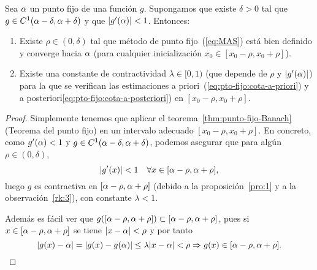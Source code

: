 \begin{theorem}
  \label{thm:punto-fijo-convergencia-local}
  Sea $\alpha$ un punto fijo de una función $g$. Supongamos que existe
  $\delta>0$ tal que $g\in C^1(\alpha-\delta,\alpha+\delta)$ y que
  $|g'(\alpha)|<1$. Entonces:
  \begin{enumerate}
  \item Existe $\rho\in (0,\delta)$ tal que método de punto
    fijo~(\ref{eq:MAS}) está bien definido y converge hacia $\alpha$
    (para cualquier inicialización $x_0 \in [x_0-\rho,x_0+\rho]$).
  \item Existe una constante de contractividad $\lambda\in [0,1)$ (que
    depende de $\rho$ y $|g'(\alpha)|$) para la que se verifican las
    estimaciones a priori~(\ref{eq:pto-fijo:cota-a-priori}) y a
    posteriori\ref{eq:pto-fijo:cota-a-posteriori}) en
    $[x_0-\rho,x_0+\rho]$.
  \end{enumerate}
\end{theorem}
\begin{proof}
  Simplemente tenemos que aplicar el
  teorema~\ref{thm:punto-fijo-Banach} (Teorema del punto fijo) en un
  intervalo adecuado $[x_0-\rho,x_0+\rho]$. En concreto, como
  $g'(\alpha)<1$ y $g \in C^1(\alpha-\delta,\alpha+\delta)$, podemos
  asegurar que para algún $\rho\in(0,\delta)$,
  $$
  |g'(x)|<1 \quad \forall x\in [\alpha-\rho, \alpha+\rho],
  $$
  luego $g$ es contractiva en $[\alpha-\rho, \alpha+\rho]$ (debido a
  la proposición~\ref{pro:1} y a la observación~\ref{rk:3}), con
  constante $\lambda<1$.

  Además es fácil ver que $g([\alpha-\rho, \alpha+\rho]) \subset
  [\alpha-\rho, \alpha+\rho]$, pues si $x\in[\alpha-\rho, \alpha+\rho]$
  se tiene $ |x-\alpha|<\rho$ y por tanto
  $$
  |g(x)-\alpha| = |g(x)-g(\alpha)| \le \lambda |x-\alpha|< \rho
  \Rightarrow g(x)\in [\alpha-\rho, \alpha+\rho].
  $$
\end{proof}

